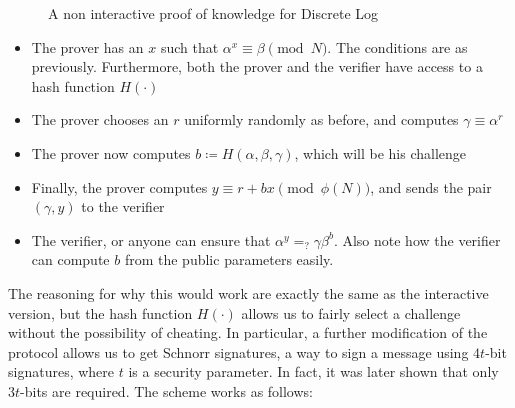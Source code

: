 \documentclass{article}
\begin{document}
\begin{figure}[H]
    \centering
    \caption{A non interactive proof of knowledge for Discrete Log}
    \label{discretelognoninteractive}
\end{figure}

\begin{itemize}
    \item The prover has an $x$ such that $\alpha^x \equiv \beta \pmod N$. The conditions are as previously.
          Furthermore, both the prover and the verifier have access to a hash function $H(\cdot)$
    \item The prover chooses an $r$ uniformly randomly as before, and computes $\gamma \equiv \alpha^r$
    \item The prover now computes $b \coloneqq H(\alpha, \beta, \gamma)$, which will be his challenge
    \item Finally, the prover computes $y \equiv r + bx \pmod{\phi(N)}$, and sends the pair $(\gamma, y)$ to the verifier
    \item The verifier, or anyone can ensure that $ \alpha^y =_? \gamma \beta^b$. Also note how the verifier can compute
          $b$ from the public parameters easily.
\end{itemize}

The reasoning for why this would work are exactly the same as the interactive version, but the hash function
$H(\cdot)$ allows us to fairly select a challenge without the possibility of cheating. In particular, a further
modification of the protocol allows us to get Schnorr signatures, a way to sign a message using $4t$-bit signatures,
where $t$ is a security parameter. In fact, it was later shown \cite{nevenHashFunctionRequirements2009} that only $3t$-bits
are required. The scheme works as follows:
\end{document}
